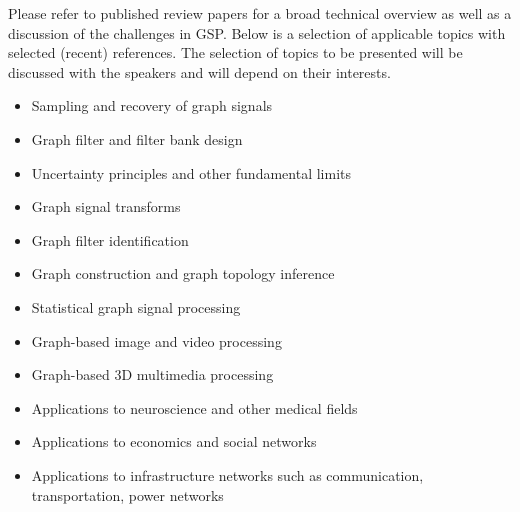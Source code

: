 \documentclass[a4paper]{scrartcl}
\begin{document}
Please refer to published review papers \cite{shuman_emerging_2013,
sandryhaila_discrete_2014, coifman_diffusion_2006, ekambaram_circulant_2013} for
a broad technical overview as well as a discussion of the challenges in GSP.
Below is a selection of applicable topics with selected (recent) references. The
selection of topics to be presented will be discussed with the speakers and will
depend on their interests.
\begin{itemize}
	\setlength{\itemsep}{0pt} \setlength{\parskip}{0pt}
	\item Sampling and recovery of graph signals \cite{puy2015random,tsitsvero2015signals,anis2014towards}
	\item Graph filter and filter bank design \cite{hammond2011wavelets,narang_bior_filters,ekambaram_globalsip,leonardi_multislice,leonardi_fmri,shuman2013spectrum}
	\item Uncertainty principles and other fundamental limits \cite{perraudin2016global,agaskar_spie,pasdeloup}
	\item Graph signal transforms \cite{szlam,gavish,Maggioni_biorthogonal,coifman_diffusion_2006,lafon_coarse,narang_lifting_graphs}
	\item Graph filter identification \cite{thanou_TSP_2014}
	\item Graph construction and graph topology inference \cite{kalofolias2016learn,Dong:2014tj}
	\item Statistical graph signal processing \cite{perraudin2016stationary,zhang2015graph,gadde2015probabilistic}
	\item Graph-based image and video processing \cite{elmoataz2008nonlocal,lezoray2008nonlocal,shahid2015fast}
	\item Graph-based 3D multimedia processing \cite{zhang2014point,
		thanou2015graph, nguyen2014compression, schoenenberger2015graph}
	\item Applications to neuroscience and other medical fields \cite{huang2015graph,hu2015spectral}
	\item Applications to economics and social networks
	\item Applications to infrastructure networks such as communication, transportation, power networks \cite{mcgraw,jain2014big,borgnat2011shared}

\end{itemize}
\end{document}
